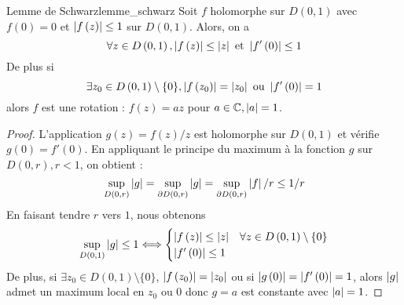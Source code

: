 \documentclass{cours}
\begin{document}
\begin{théorème}{Lemme de Schwarz}{lemme_schwarz}
    Soit $f$ holomorphe sur $D\left(0, 1\right)$ avec $f\left(0\right) = 0$ et $\left|f\left(z\right)\right| \leq 1$ sur $D\left(0, 1\right)$. Alors, on a 
    \begin{equation*}
        \forall z \in D\left(0, 1\right), \left|f\left(z\right)\right| \leq \left|z\right| \text{ et } \left|f'\left(0\right)\right|\leq 1
    \end{equation*}
    De plus si 
    \begin{equation*}
        \exists z_{0}\in D\left(0, 1\right)\setminus \{0\}, \left|f\left(z_{0}\right)\right| = \left|z_{0}\right| \text{ ou } \left|f'\left(0\right)\right| = 1
    \end{equation*}
    alors $f$ est une rotation : $f\left(z\right) = az$ pour $a \in \mathbb{C}, \left|a\right| = 1$.
\end{théorème}
\begin{proof}
    L'application $g\left(z\right) = f\left(z\right)/z$ est holomorphe sur $D\left(0, 1\right)$ et vérifie $g\left(0\right) = f'\left(0\right)$. En appliquant le principe du maximum à la fonction $g$ sur $D\left(0, r\right), r < 1$, on obtient : 
    \begin{equation*}
        \sup_{D\left(0, r\right)}\left|g\right| = \sup_{\partial D\left(0, r\right)}\left|g\right| = \sup_{\partial D\left(0, r\right)}\left|f\right|/r \leq 1/r
    \end{equation*}
    En faisant tendre $r$ vers $1$, nous obtenons
    \begin{equation*}
        \sup_{D\left(0, 1\right)}\left|g\right| \leq 1 \Longleftrightarrow \begin{cases}
            \left|f\left(z\right)\right| \leq \left|z\right| & \forall z \in D\left(0, 1\right)\setminus \{0\}\\
            \left|f'\left(0\right)\right| \leq 1 &
        \end{cases}
    \end{equation*}
    De plus, si $\exists z_{0} \in D\left(0, 1\right)\setminus \{0\}$, $\left|f\left(z_{0}\right)\right| = \left|z_{0}\right|$ ou si $\left|g\left(0\right)\right| = \left|f'\left(0\right)\right| = 1$, alors $\left|g\right|$ admet un maximum local en $z_{0}$ ou $0$ donc $g = a$ est constante avec $\left|a\right| = 1$.
\end{proof}
\end{document}
